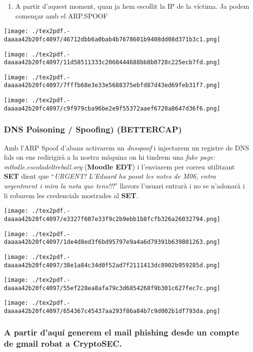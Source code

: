 \documentclass[]{article}
\providecommand{\tightlist}{%
  \setlength{\itemsep}{0pt}\setlength{\parskip}{0pt}}
\begin{document}
\begin{enumerate}
\def\labelenumi{\arabic{enumi}.}
\setcounter{enumi}{2}
\tightlist
\item
  A partir d'aquest moment, quan ja hem escollit la IP de la víctima. Ja
  podem començar amb el ARP.SPOOF
\end{enumerate}

\texttt{[image: ./tex2pdf.-daaaa42b20fc4097/46712dbb6a0bab4b7678601b9408dd08d371b3c1.png]}

\texttt{[image: ./tex2pdf.-daaaa42b20fc4097/11d58511333c2068444688bb8b0728c225ecb7fd.png]}

\texttt{[image: ./tex2pdf.-daaaa42b20fc4097/7fffb68e3e33e5688375ebfd87d43ed69feb31f7.png]}

\texttt{[image: ./tex2pdf.-daaaa42b20fc4097/c9f979cba96be2e9f55372aaef6720a8647d36f6.png]}

\hypertarget{dns-poisoning-spoofing-bettercap}{%
\subsubsection{\texorpdfstring{\textbf{DNS Poisoning / Spoofing)
(BETTERCAP)}}{DNS Poisoning / Spoofing) (BETTERCAP)}}\label{dns-poisoning-spoofing-bettercap}}

Amb l'ARP Spoof d'abans activarem un \emph{dnsspoof} i injectarem un
registre de DNS fals on ens redirigirà a la nostra màquina on hi tindrem
una \emph{fake page: m0odle.escoladeltreball.org} (\textbf{Moodle EDT})
i l'enviarem per correu utilitzant \textbf{SET} dient que
``\emph{URGENT! L'Eduard ha posat les notes de M06, entra urgentment i
mira la nota que tens!!!}'' llavors l'usuari entrarà i no se n'adonarà i
li robarem les credencials mostrades al \textbf{SET}.

\texttt{[image: ./tex2pdf.-daaaa42b20fc4097/e3327f607e33f9c2b9ebb1b8fcfb326a26032794.png]}

\texttt{[image: ./tex2pdf.-daaaa42b20fc4097/1de4d8ed3f6bd95797e9a4a6d79391b639801263.png]}

\texttt{[image: ./tex2pdf.-daaaa42b20fc4097/38e1a84c34d0f52ad7f2111413dc8902b959285d.png]}

\texttt{[image: ./tex2pdf.-daaaa42b20fc4097/55ef228ea8afa79c3d6854268f9b301c627fec7c.png]}

\texttt{[image: ./tex2pdf.-daaaa42b20fc4097/654367c45437aa293f86a84b7c9d002b1df793da.png]}

\hypertarget{a-partir-daquuxed-generem-el-mail-phishing-desde-un-compte-de-gmail-robat-a-cryptosec.}{%
\subsubsection{\texorpdfstring{A partir d'aquí generem el \textbf{mail
phishing} desde un compte de gmail robat a
\textbf{CryptoSEC}.}{A partir d'aquí generem el mail phishing desde un compte de gmail robat a CryptoSEC.}}\label{a-partir-daquuxed-generem-el-mail-phishing-desde-un-compte-de-gmail-robat-a-cryptosec.}}
\end{document}
